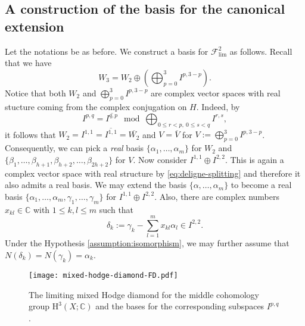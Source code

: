 \subsection{A construction of the basis for the canonical extension}



Let the notations be as before. We construct a basis for 
\(\mathcal{F}_{\mathrm{lim}}^{2}\) as follows. Recall that we have
\begin{equation}
W_{3}=W_{2}\oplus \left(\bigoplus_{p=0}^{3} I^{p,3-p}\right).
\end{equation}
Notice that both \(W_{2}\) and \(\bigoplus_{p=0}^{3} I^{p,3-p}\)
are complex vector spaces with real stucture
coming from the complex conjugation on \(H\).
Indeed, by 
\begin{equation}
I^{p,q} = \overline{I^{q,p}} \mod{\bigoplus_{0\le r<p,~0\le s<q} I^{r,s}},
\end{equation}
it follows that \(W_{2} = I^{1,1} = \overline{I^{1,1}}=\overline{W_{2}}\) and 
\(V = \overline{V}\) for \(V:=\bigoplus_{p=0}^{3} I^{p,3-p}\).
Consequently, we can pick a \emph{real} basis
\(\{\alpha_{1},\ldots,\alpha_{m}\}\) for \(W_{2}\) and 
\(\{\beta_{1},\ldots,\beta_{h+1},\beta_{h+2},\ldots,\beta_{2h+2}\}\) 
for \(V\). Now consider \(I^{1,1}\oplus I^{2,2}\). 
This is again a complex vector space with real structure
by \eqref{eq:deligne-splitting} and therefore it also 
admits a real basis. We may extend the basis \(\{\alpha,\ldots,\alpha_{m}\}\)
to become a real basis 
\(\{\alpha_{1},\ldots,\alpha_{m},\gamma_{1},\ldots,\gamma_{m}\}\) 
for \(I^{1,1}\oplus I^{2,2}\). Also, there are complex numbers
\(x_{kl}\in\mathbb{C}\) with \(1\le k,l\le m\) such that
\begin{equation}
\delta_{k}:=\gamma_{k}-\sum_{l=1}^{m} x_{kl}\alpha_{l}\in I^{2,2}.
\end{equation}
Under the Hypothesis \ref{assumption:isomorphism}, we 
may further assume that \(N(\delta_{k})=N(\gamma_{k})=\alpha_{k}\).



\begin{figure}
\texttt{[image: mixed-hodge-diamond-FD.pdf]}
\caption{The limiting mixed Hodge diamond for the
middle cohomology group \(\mathrm{H}^{3}(X;\mathbb{C})\) and the bases for
the corresponding subspaces \(I^{p,q}\).}
\label{fig:mixed-hodge}
\end{figure}

